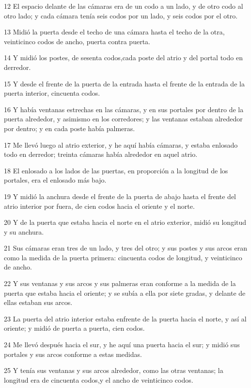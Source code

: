 \par 12 El espacio delante de las cámaras era de un codo a un lado, y de otro codo al otro lado; y cada cámara tenía seis codos por un lado, y seis codos por el otro.
\par 13 Midió la puerta desde el techo de una cámara hasta el techo de la otra, veinticinco codos de ancho, puerta contra puerta.
\par 14 Y midió los postes, de sesenta codos,cada poste del atrio y del portal todo en derredor.
\par 15 Y desde el frente de la puerta de la entrada hasta el frente de la entrada de la puerta interior, cincuenta codos.
\par 16 Y había ventanas estrechas en las cámaras, y en sus portales por dentro de la puerta alrededor, y asimismo en los corredores; y las ventanas estaban alrededor por dentro; y en cada poste había palmeras.
\par 17 Me llevó luego al atrio exterior, y he aquí había cámaras, y estaba enlosado todo en derredor; treinta cámaras había alrededor en aquel atrio.
\par 18 El enlosado a los lados de las puertas, en proporción a la longitud de los portales, era el enlosado más bajo.
\par 19 Y midió la anchura desde el frente de la puerta de abajo hasta el frente del atrio interior por fuera, de cien codos hacia el oriente y el norte.
\par 20 Y de la puerta que estaba hacia el norte en el atrio exterior, midió su longitud y su anchura.
\par 21 Sus cámaras eran tres de un lado, y tres del otro; y sus postes y sus arcos eran como la medida de la puerta primera: cincuenta codos de longitud, y veinticinco de ancho.
\par 22 Y sus ventanas y sus arcos y sus palmeras eran conforme a la medida de la puerta que estaba hacia el oriente; y se subía a ella por siete gradas, y delante de ellas estaban sus arcos. 
\par 23 La puerta del atrio interior estaba enfrente de la puerta hacia el norte, y así al oriente; y midió de puerta a puerta, cien codos.
\par 24 Me llevó después hacia el sur, y he aquí una puerta hacia el sur; y midió sus portales y sus arcos conforme a estas medidas.
\par 25 Y tenía sus ventanas y sus arcos alrededor, como las otras ventanas; la longitud era de cincuenta codos,y el ancho de veinticinco codos.
